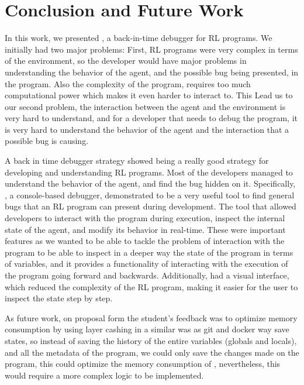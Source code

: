 
\section{Conclusion and Future Work}
\label{sec:conclusion}

In this work, we presented \flik, a back-in-time debugger for \ac{RL} programs.
We initially had two major problems: First, \ac{RL} programs were very complex in terms of the environment,
so the developer would have major problems in understanding the behavior of the agent, and
the possible bug being presented, in the program. Also the complexity of the program, requires
too much computational power which makes it even harder to interact to. This Lead us to our second problem,
the interaction between the agent and the environment is very hard to understand, and
for a developer that needs to debug the program, it is very hard to understand the behavior of the agent
and the interaction that a possible bug is causing.

A back in time debugger strategy showed being a really good strategy for developing and 
understanding \ac{RL} programs. Most of the developers managed to understand the behavior of the agent,
and find the bug hidden on it. Specifically, \flik, a console-based debugger, demonstrated to 
be a very useful tool to find general bugs that an \ac{RL} program can present during development. 
The tool that allowed developers to interact with the program during 
execution, inspect the internal state of the agent, and modify its behavior in real-time. These were 
important features as we wanted \flik to be able to tackle the problem of interaction with the 
program to be able to inspect in a deeper way the state of the program in terms of variables, and 
it provides a functionality of interacting with the execution of the program going forward and backwards.
Additionally, \flik had a visual interface, which reduced the complexity of the \ac{RL} program,
making it easier for the user to inspect the state step by step.



As future work, on proposal form the student's feedback was to optimize memory consumption by 
using layer cashing in a similar was as git and docker way save states, so instead of saving the
history of the entire variables (globals and locals), and all the metadata of the program, we could 
only save the changes made on the program, this could optimize the memory consumption of \flik,
nevertheless, this would require a more complex logic to be implemented. 


